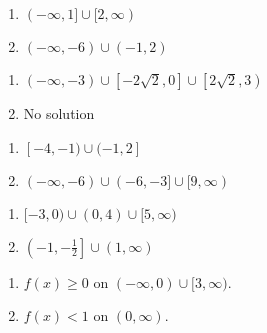 \documentclass{ximera}
\begin{document}
\begin{multicols}{2}
\begin{enumerate}
\setcounter{enumi}{\value{HW}}

\item $(-\infty, 1] \cup [2, \infty)$
\item $(-\infty, -6) \cup (-1, 2)$

\setcounter{HW}{\value{enumi}}
\end{enumerate}
\end{multicols}

\begin{multicols}{2}
\begin{enumerate}
\setcounter{enumi}{\value{HW}}

\item $(-\infty, -3) \cup \left[-2\sqrt{2}, 0\right] \cup \left[2\sqrt{2}, 3\right)$
\item No solution

\setcounter{HW}{\value{enumi}}
\end{enumerate}
\end{multicols}

\begin{multicols}{2}
\begin{enumerate}
\setcounter{enumi}{\value{HW}}

\item  $[-4, -1) \cup (-1,2]$
\item   $(-\infty, -6) \cup (-6, -3] \cup [9, \infty)$

\setcounter{HW}{\value{enumi}}
\end{enumerate}
\end{multicols}

\begin{multicols}{2}
\begin{enumerate}
\setcounter{enumi}{\value{HW}}

\item $[-3,0) \cup (0,4) \cup [5, \infty)$
\item  $\left(-1,-\frac{1}{2}\right] \cup (1, \infty)$

\setcounter{HW}{\value{enumi}}
\end{enumerate}
\end{multicols}

\begin{multicols}{2}
\begin{enumerate}
\setcounter{enumi}{\value{HW}}

\item $f(x) \geq 0$ on $(-\infty, 0) \cup [3, \infty)$.

\item $f(x) < 1$ on $(0, \infty)$.

\setcounter{HW}{\value{enumi}}
\end{enumerate}
\end{multicols}
\end{document}
